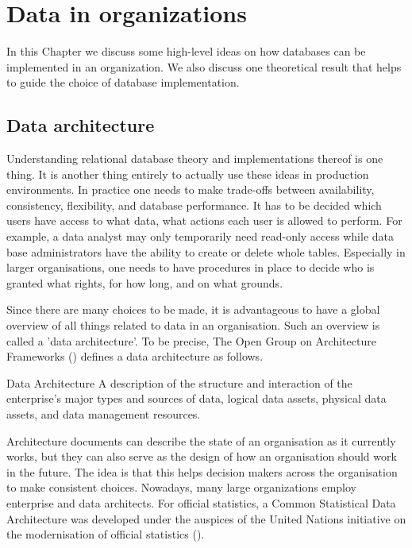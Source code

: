 \chapter{Data in organizations}
In this Chapter we discuss some high-level ideas on how databases can be
implemented in an organization. We also discuss one theoretical result that
helps to guide the choice of database implementation.


\section{Data architecture}
Understanding relational database theory and implementations thereof is one
thing. It is another thing entirely to actually use these ideas in production
environments. In practice one needs to make trade-offs between availability,
consistency, flexibility, and database performance. It has to be decided which
users have access to what data, what actions each user is allowed to perform.
For example, a data analyst may only temporarily need read-only access while
data base administrators have the ability to create or delete whole tables.
Especially in larger organisations, one needs to have procedures in place to
decide who is granted what rights, for how long, and on what grounds. 

Since there are many choices to be made, it is advantageous to have a global
overview of all things related to data in an organisation.  Such an overview is
called a 'data architecture'. To be precise, The Open Group on Architecture
Frameworks
()
defines a data architecture as follows.

\begin{terminology}{Data Architecture} 
A description of the structure and interaction of the enterprise's major types
and sources of data, logical data assets, physical data assets, and data
management resources. 
\end{terminology}
Architecture documents can describe the state of an organisation as it
currently works, but they can also serve as the design of how an organisation
should work in the future.  The idea is that this helps decision makers across
the organisation to make consistent choices. Nowadays, many large organizations
employ enterprise and data architects. For official statistics, a Common
Statistical Data Architecture was developed under the auspices of the United
Nations initiative on the modernisation of official statistics
().

